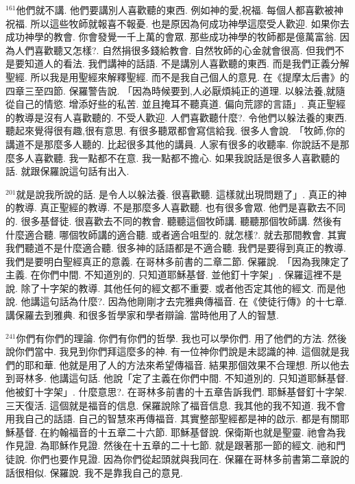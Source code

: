 \documentclass{book}
\begin{document}
$^{161}$他們就不講.
他們要講別人喜歡聽的東西.
例如神的愛,祝福.
每個人都喜歡被神祝福.
所以這些牧師就報喜不報憂.
也是原因為何成功神學這麼受人歡迎.
如果你去成功神學的教會.
你會發覺一千上萬的會眾.
那些成功神學的牧師都是億萬富翁.
因為人們喜歡聽又怎樣?.
自然捐很多錢給教會.
自然牧師的心金就會很高.
但我們不是要知道人的看法.
我們講神的話語.
不是講別人喜歡聽的東西.
而是我們正義分解聖經.
所以我是用聖經來解釋聖經.
而不是我自己個人的意見.
在《提摩太后書》的四章三至四節.
保羅警告說.
「因為時候要到,人必厭煩純正的道理.
以躲法養,就隨從自己的情慾.
增添好些的私苦.
並且掩耳不聽真道.
偏向荒謬的言語」.
真正聖經的教導是沒有人喜歡聽的.
不受人歡迎.
人們喜歡聽什麼?.
令他們以躲法養的東西.
聽起來覺得很有趣,很有意思.
有很多聽眾都會寫信給我.
很多人會說.
「牧師,你的講道不是那麼多人聽的.
比起很多其他的講員.
人家有很多的收聽率.
你說話不是那麼多人喜歡聽.
我一點都不在意.
我一點都不擔心.
如果我說話是很多人喜歡聽的話.
就跟保羅說這句話有出入.

$^{201}$就是說我所說的話.
是令人以躲法養.
很喜歡聽.
這樣就出現問題了」.
真正的神的教導.
真正聖經的教導.
不是那麼多人喜歡聽.
也有很多會眾.
他們是喜歡去不同的.
很多基督徒.
很喜歡去不同的教會.
聽聽這個牧師講.
聽聽那個牧師講.
然後有什麼適合聽.
哪個牧師講的適合聽.
或者適合咀型的.
就怎樣?.
就去那間教會.
其實我們聽道不是什麼適合聽.
很多神的話語都是不適合聽.
我們是要得到真正的教導.
我們是要明白聖經真正的意義.
在哥林多前書的二章二節.
保羅說.
「因為我陳定了主義.
在你們中間.
不知道別的.
只知道耶穌基督.
並他釘十字架」.
保羅這裡不是說.
除了十字架的教導.
其他任何的經文都不重要.
或者他否定其他的經文.
而是他說.
他講這句話為什麼?.
因為他剛剛才去完雅典傳福音.
在《使徒行傳》的十七章.
講保羅去到雅典.
和很多哲學家和學者辯論.
當時他用了人的智慧.

$^{241}$你們有你們的理論.
你們有你們的哲學.
我也可以學你們.
用了他們的方法.
然後說你們當中.
我見到你們拜這麼多的神.
有一位神你們說是未認識的神.
這個就是我們的耶和華.
他就是用了人的方法來希望傳福音.
結果那個效果不合理想.
所以他去到哥林多.
他講這句話.
他說「定了主義在你們中間.
不知道別的.
只知道耶穌基督.
他被釘十字架」.
什麼意思?.
在哥林多前書的十五章告訴我們.
耶穌基督釘十字架.
三天復活.
這個就是福音的信息.
保羅說除了福音信息.
我其他的我不知道.
我不會用我自己的話語.
自己的智慧來再傳福音.
其實整部聖經都是神的啟示.
都是有關耶穌基督.
在約翰福音的十五章二十六節.
耶穌基督說.
保衛斯也就是聖靈.
祂會為我作見證.
為耶穌作見證.
然後在十五章的二十七節.
就是跟著那一節的經文.
祂和門徒說.
你們也要作見證.
因為你們從起頭就與我同在.
保羅在哥林多前書第二章說的話很相似.
保羅說.
我不是靠我自己的意見.
\end{document}
